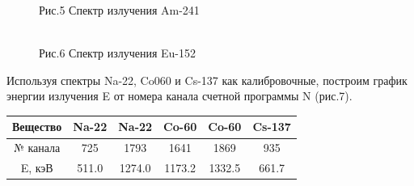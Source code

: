 \documentclass[12pt,a4paper]{article}
\begin{document}
\begin{figure}[H]
\begin{minipage}[h]{0.45\linewidth}
 Рис.5 Спектр излучения Am-241 \\
\end{minipage}
\hfill
\begin{minipage}[h]{0.45\linewidth}
 \\ Рис.6 Спектр излучения Eu-152
\end{minipage}
\end{figure}

Используя спектры Na-22, Co060 и Cs-137 как калибровочные, построим график энергии излучения E от номера канала счетной программы N (рис.7).

\begin{center}
\begin{tabular}{|c|c|c|c|c|c|}
\hline 
Вещество & Na-22 & Na-22 & Co-60 & Co-60 & Cs-137 \\ 
\hline 
№ канала & 725 & 1793 & 1641 & 1869 & 935 \\ 
\hline 
E, кэВ & 511.0 & 1274.0 & 1173.2 & 1332.5 & 661.7 \\ 
\hline 
\end{tabular} 
\end{center}
\end{document}
